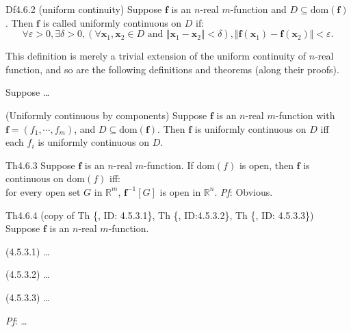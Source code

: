 \documentclass{article}
\begin{document}
\begin{Df}{Df4.6.2 (uniform continuity)}
    Suppose $\pmb{f}$ is an $n$-real $m$-function and $D\subseteq\text{dom}(\pmb{f})$. Then $\pmb{f}$ is called uniformly continuous on $D$ if:
    $$\forall\varepsilon>0, \exists\delta>0, \left(\forall \pmb{x}_1, \pmb{x}_2\in D\text{ and } \Vert\pmb{x}_1-\pmb{x}_2\Vert <\delta\right), \Vert\pmb{f}(\pmb{x}_1)-\pmb{f}(\pmb{x}_2)\Vert<\varepsilon.$$
\end{Df}

\begin{Rmk}{}
    This definition is merely a trivial extension of the uniform continuity of $n$-real function, and so are the following definitions and theorems (along their proofs).
    \begin{compactenum}
        \item \textcolor{Th}{Suppose \dots}
        \item \textcolor{Th}{(Uniformly continuous by components) Suppose $\pmb{f}$ is an $n$-real $m$-function with $\pmb{f} = (f_1, \cdots, f_m)$, and $D\subseteq\text{dom}(\pmb{f})$. Then $\pmb{f}$ is uniformly continuous on $D$ iff each $f_i$ is uniformly continuous on $D$.}
    \end{compactenum}
\end{Rmk}

\begin{Th}{Th4.6.3}
    Suppose $\pmb{f}$ is an $n$-real $m$-function. If $\text{dom}(f)$ is open, then $\pmb{f}$ is continuous on $\text{dom}(f)$ iff: \\
    for every open set $G$ in $\mathbb{R}^m$, $\pmb{f}^{-1}[G]$ is open in $\mathbb{R}^n$.
    \tcblower
    \textit{Pf}: Obvious.
\end{Th}

\begin{Th}{Th4.6.4 (copy of Th \{, ID: 4.5.3.1\}, Th \{, ID:4.5.3.2\}, Th \{, ID: 4.5.3.3\})}
    Suppose $\pmb{f}$ is an $n$-real $m$-function. 
    \begin{compactenum}
        \item (4.5.3.1) \dots
        \item (4.5.3.2) \dots
        \item (4.5.3.3) \dots
    \end{compactenum}
    \tcblower
    \textit{Pf}: \dots
\end{Th}
\end{document}
